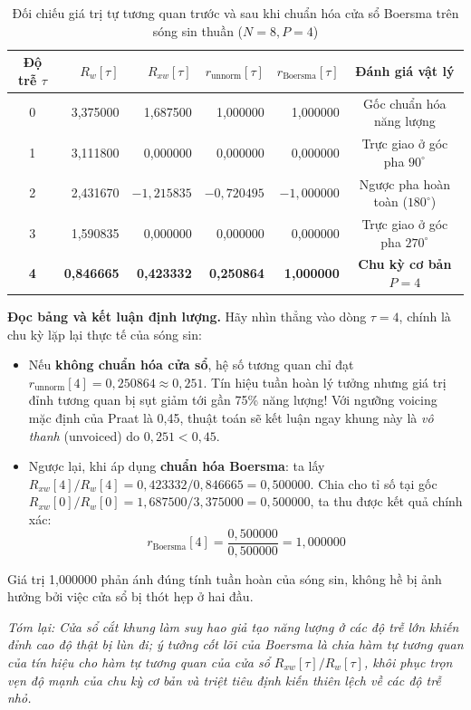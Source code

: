 \begin{table}[H]
\centering
\small
\caption{Đối chiếu giá trị tự tương quan trước và sau khi chuẩn hóa cửa sổ Boersma trên sóng sin thuần ($N=8, P=4$)}
\label{tab:ch00_norm_sine}
\begin{tabular}{crrrrc}
\toprule
Độ trễ $\tau$ & $R_w[\tau]$ & $R_{xw}[\tau]$ & $r_{\text{unnorm}}[\tau]$ & $r_{\text{Boersma}}[\tau]$ & Đánh giá vật lý \\
\midrule
0 & 3,375000 & 1,687500 & 1,000000 & 1,000000 & Gốc chuẩn hóa năng lượng \\
1 & 3,111800 & 0,000000 & 0,000000 & 0,000000 & Trực giao ở góc pha $90^\circ$ \\
2 & 2,431670 & $-1{,}215835$ & $-0{,}720495$ & $-1{,}000000$ & Ngược pha hoàn toàn ($180^\circ$) \\
3 & 1,590835 & 0,000000 & 0,000000 & 0,000000 & Trực giao ở góc pha $270^\circ$ \\
\textbf{4} & \textbf{0,846665} & \textbf{0,423332} & \textbf{0,250864} & \textbf{1,000000} & \textbf{Chu kỳ cơ bản $P=4$} \\
\bottomrule
\end{tabular}
\end{table}

\textbf{Đọc bảng và kết luận định lượng.} Hãy nhìn thẳng vào dòng $\tau = 4$, chính là chu kỳ lặp lại thực tế của sóng sin:
\begin{itemize}[leftmargin=1.5em, itemsep=2pt]
    \item Nếu \textbf{không chuẩn hóa cửa sổ}, hệ số tương quan chỉ đạt $r_{\text{unnorm}}[4] = 0{,}250864 \approx 0{,}251$. Tín hiệu tuần hoàn lý tưởng nhưng giá trị đỉnh tương quan bị sụt giảm tới gần 75\% năng lượng! Với ngưỡng voicing mặc định của Praat là 0,45, thuật toán sẽ kết luận ngay khung này là \emph{vô thanh} (unvoiced) do $0{,}251 < 0{,}45$.
    \item Ngược lại, khi áp dụng \textbf{chuẩn hóa Boersma}: ta lấy $R_{xw}[4] / R_w[4] = 0{,}423332 / 0{,}846665 = 0{,}500000$. Chia cho tỉ số tại gốc $R_{xw}[0] / R_w[0] = 1{,}687500 / 3{,}375000 = 0{,}500000$, ta thu được kết quả chính xác:
    \begin{equation}
    r_{\text{Boersma}}[4] = \frac{0{,}500000}{0{,}500000} = 1{,}000000
    \end{equation}
\end{itemize}
Giá trị 1,000000 phản ánh đúng tính tuần hoàn của sóng sin, không hề bị ảnh hưởng bởi việc cửa sổ bị thót hẹp ở hai đầu.

\textit{Tóm lại: Cửa sổ cắt khung làm suy hao giả tạo năng lượng ở các độ trễ lớn khiến đỉnh cao độ thật bị lùn đi; ý tưởng cốt lõi của Boersma là chia hàm tự tương quan của tín hiệu cho hàm tự tương quan của cửa sổ $R_{xw}[\tau] / R_w[\tau]$, khôi phục trọn vẹn độ mạnh của chu kỳ cơ bản và triệt tiêu định kiến thiên lệch về các độ trễ nhỏ.}

